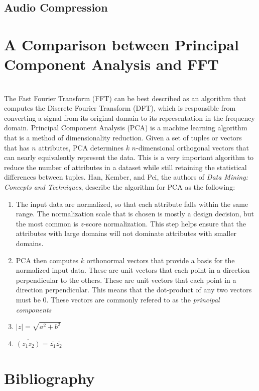 \documentclass{amsproc}
\begin{document}
\subsection{Audio Compression}

\section{A Comparison between Principal Component Analysis and FFT}

\mbox{}	 \\
\indent The Fast Fourier Transform (FFT) can be best described as an algorithm that computes the Discrete Fourier Transform (DFT), which is responsible from converting a signal from its original domain to its representation in the frequency domain. Principal Component Analysis (PCA) is a machine learning algorithm that is a method of dimensionality reduction. Given a set of tuples or vectors that has $n$ attributes, PCA determines $k$ $n$-dimensional orthogonal vectors that can nearly equivalently represent the data. This is a very important algorithm to reduce the number of attributes in a dataset while still retaining the statistical differences between tuples. Han, Kember, and Pei, the authors of \textit{Data Mining: Concepts and Techniques}, describe the algorithm for PCA as the following:

\begin{enumerate}
	\item The input data are normalized, so that each attribute falls within the same range. The normalization scale that is chosen is mostly a design decision, but the most common is $z$-score normalization. This step helps ensure that the attributes with large domains will not dominate attributes with smaller domains.
	\item PCA then computes $k$ orthonormal vectors that provide a basis for the normalized input data. These are unit vectors that each point in a direction perpendicular to the others. These are unit vectors that each point in a direction perpendicular. This means that the dot-product of any two vectors must be $0$. These vectors are commonly refered to as the \textit{principal components}
	\item $|z| = \sqrt{a^2 + b^2}$
	\item $\overline{(z_1 z_2)} = \bar{z_1}\bar{z_2}$

\end{enumerate}

\newpage
\section{Bibliography}
\end{document}
